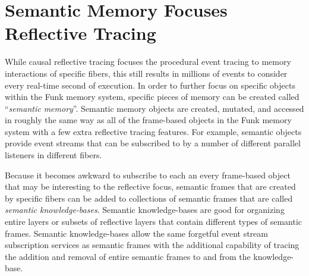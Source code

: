 \section{Semantic Memory Focuses Reflective Tracing}

While causal reflective tracing focuses the procedural event tracing
to memory interactions of specific fibers, this still results in
millions of events to consider every real-time second of execution.
In order to further focus on specific objects within the Funk memory
system, specific pieces of memory can be created called
``\emph{semantic memory}''.  Semantic memory objects are created,
mutated, and accessed in roughly the same way as all of the
frame-based objects in the Funk memory system with a few extra
reflective tracing features.  For example, semantic objects provide
event streams that can be subscribed to by a number of different
parallel listeners in different fibers.

Because it becomes awkward to subscribe to each an every frame-based
object that may be interesting to the reflective focus, semantic
frames that are created by specific fibers can be added to collections
of semantic frames that are called \emph{semantic knowledge-bases}.
Semantic knowledge-bases are good for organizing entire layers or
subsets of reflective layers that contain different types of semantic
frames.  Semantic knowledge-bases allow the same forgetful event
stream subscription services as semantic frames with the additional
capability of tracing the addition and removal of entire semantic
frames to and from the knowledge-base.

